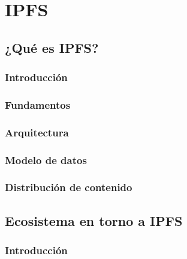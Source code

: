 \chapter{IPFS}
\section{¿Qué es IPFS?}
\subsection{Introducción}
\subsection{Fundamentos}
\subsection{Arquitectura}
\subsection{Modelo de datos}
\subsection{Distribución de contenido}

\section{Ecosistema en torno a IPFS}

\subsection{Introducción}
